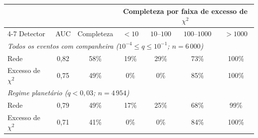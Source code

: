 \begin{tabular}{lcccccc}
	\toprule
	 & & & \multicolumn{4}{c}{Completeza por faixa de excesso de $\chi^2$} \\
	\cmidrule(lr){4-7}
	Detector & AUC & Completeza & $<10$ & $10$--$100$ & $100$--$1000$ & $>1000$ \\
	\midrule
	\multicolumn{7}{l}{\textit{Todos os eventos com companheira ($10^{-4} \leq q \leq 10^{-1}$; $n = 6\,000$)}} \\
	Rede & 0{,}82 & 58\% & 19\% & 29\% & 73\% & 100\% \\
	Excesso de $\chi^2$ & 0{,}75 & 49\% & 0\% & 0\% & 85\% & 100\% \\
	\midrule
	\multicolumn{7}{l}{\textit{Regime planetário ($q < 0{,}03$; $n = 4\,954$)}} \\
	Rede & 0{,}79 & 49\% & 17\% & 25\% & 68\% & 99\% \\
	Excesso de $\chi^2$ & 0{,}71 & 41\% & 0\% & 0\% & 84\% & 100\% \\
	\bottomrule
\end{tabular}
